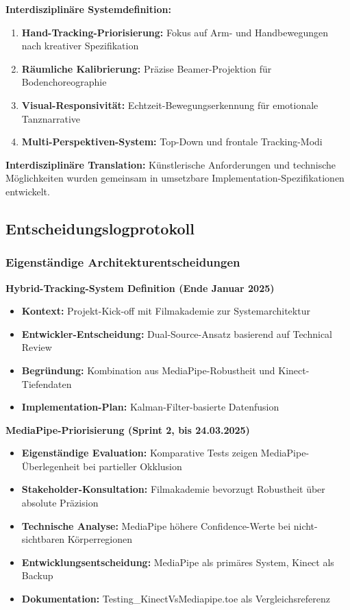 \textbf{Interdisziplinäre Systemdefinition:}
\begin{enumerate}
    \item \textbf{Hand-Tracking-Priorisierung:} Fokus auf Arm- und Handbewegungen nach kreativer Spezifikation
    \item \textbf{Räumliche Kalibrierung:} Präzise Beamer-Projektion für Bodenchoreographie
    \item \textbf{Visual-Responsivität:} Echtzeit-Bewegungserkennung für emotionale Tanznarrative  
    \item \textbf{Multi-Perspektiven-System:} Top-Down und frontale Tracking-Modi
\end{enumerate}

\textbf{Interdisziplinäre Translation:} Künstlerische Anforderungen und technische Möglichkeiten wurden gemeinsam in umsetzbare Implementation-Spezifikationen entwickelt.

\subsection{Entscheidungslogprotokoll}

\subsubsection{Eigenständige Architekturentscheidungen}

\textbf{Hybrid-Tracking-System Definition (Ende Januar 2025)}
\begin{itemize}
    \item \textbf{Kontext:} Projekt-Kick-off mit Filmakademie zur Systemarchitektur
    \item \textbf{Entwickler-Entscheidung:} Dual-Source-Ansatz basierend auf Technical Review
    \item \textbf{Begründung:} Kombination aus MediaPipe-Robustheit und Kinect-Tiefendaten
    \item \textbf{Implementation-Plan:} Kalman-Filter-basierte Datenfusion
\end{itemize}

\textbf{MediaPipe-Priorisierung (Sprint 2, bis 24.03.2025)}
\begin{itemize}
    \item \textbf{Eigenständige Evaluation:} Komparative Tests zeigen MediaPipe-Überlegenheit bei partieller Okklusion
    \item \textbf{Stakeholder-Konsultation:} Filmakademie bevorzugt Robustheit über absolute Präzision
    \item \textbf{Technische Analyse:} MediaPipe höhere Confidence-Werte bei nicht-sichtbaren Körperregionen
    \item \textbf{Entwicklungsentscheidung:} MediaPipe als primäres System, Kinect als Backup
    \item \textbf{Dokumentation:} Testing\_KinectVsMediapipe.toe als Vergleichsreferenz
\end{itemize}

